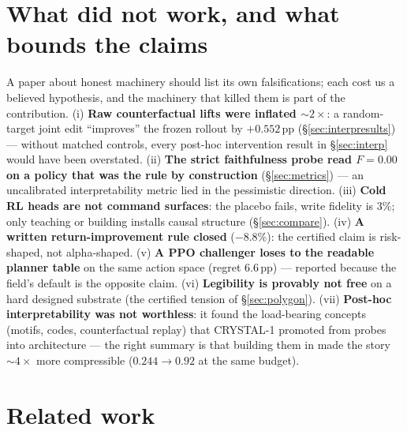 \documentclass[11pt]{article}
\begin{document}
\section{What did not work, and what bounds the claims}
\label{sec:nulls}

A paper about honest machinery should list its own falsifications; each cost us a believed
hypothesis, and the machinery that killed them is part of the contribution. (i) \textbf{Raw
counterfactual lifts were inflated ${\sim}2\times$}: a random-target joint edit
``improves'' the frozen rollout by $+0.552$\,pp (\S\ref{sec:interpresults}) --- without matched
controls, every post-hoc intervention result in \S\ref{sec:interp} would have been
overstated. (ii) \textbf{The strict faithfulness probe read $F{=}0.00$ on a policy that was
the rule by construction} (\S\ref{sec:metrics}) --- an uncalibrated interpretability metric
lied in the pessimistic direction. (iii) \textbf{Cold RL heads are not command surfaces}: the
placebo fails, write fidelity is $3\%$; only teaching or building installs causal structure
(\S\ref{sec:compare}). (iv) \textbf{A written return-improvement rule closed} ($-8.8\%$): the
certified claim is risk-shaped, not alpha-shaped. (v) \textbf{A PPO challenger loses to the
readable planner table} on the same action space (regret $6.6$\,pp) --- reported because the
field's default is the opposite claim. (vi) \textbf{Legibility is provably not free} on a hard
designed substrate (the certified tension of \S\ref{sec:polygon}). (vii) \textbf{Post-hoc
interpretability was not worthless}: it found the load-bearing concepts (motifs, codes,
counterfactual replay) that CRYSTAL-1 promoted from probes into architecture --- the right
summary is that building them in made the story ${\sim}4\times$ more compressible ($0.244 \to
0.92$ at the same budget).

\section{Related work}
\label{sec:related}
\end{document}
